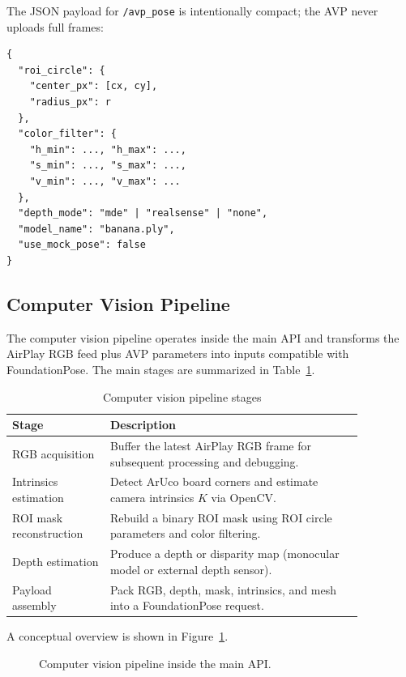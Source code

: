 The JSON payload for \texttt{/avp\_pose} is intentionally compact; the AVP never uploads full frames:

\begin{verbatim}
{
  "roi_circle": {
    "center_px": [cx, cy],
    "radius_px": r
  },
  "color_filter": {
    "h_min": ..., "h_max": ...,
    "s_min": ..., "s_max": ...,
    "v_min": ..., "v_max": ...
  },
  "depth_mode": "mde" | "realsense" | "none",
  "model_name": "banana.ply",
  "use_mock_pose": false
}
\end{verbatim}

\subsection{Computer Vision Pipeline}
\label{subsec:cv-pipeline-design}

The computer vision pipeline operates inside the main API and transforms the AirPlay RGB feed plus AVP parameters into inputs compatible with FoundationPose. The main stages are summarized in Table~\ref{tab:cv-stages}.

\begin{table}[H]
    \centering
    \caption{Computer vision pipeline stages}
    \label{tab:cv-stages}
    \begin{tabular}{p{0.24\linewidth}p{0.62\linewidth}}
        \toprule
        \textbf{Stage} & \textbf{Description} \\
        \midrule
        RGB acquisition &
        Buffer the latest AirPlay RGB frame for subsequent processing and debugging. \\
        Intrinsics estimation &
        Detect ArUco board corners and estimate camera intrinsics $K$ via OpenCV. \\
        ROI mask reconstruction &
        Rebuild a binary ROI mask using ROI circle parameters and color filtering. \\
        Depth estimation &
        Produce a depth or disparity map (monocular model or external depth sensor). \\
        Payload assembly &
        Pack RGB, depth, mask, intrinsics, and mesh into a FoundationPose request. \\
        \bottomrule
    \end{tabular}
\end{table}

A conceptual overview is shown in Figure~\ref{fig:cv_pipeline_design}.

\begin{figure}[H]
    \centering
    \caption[Computer vision pipeline]{Computer vision pipeline inside the main API.}
    \label{fig:cv_pipeline_design}
\end{figure}

